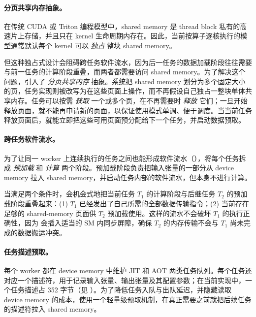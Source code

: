 \paragraph{分页共享内存抽象。}
在传统 CUDA 或 Triton 编程模型中，shared memory 是 thread block 私有的高速片上存储，并且只在 kernel 生命周期内存在。因此，当前按算子逐核执行的模型通常默认每个 kernel 可以 {\em 独占} 整块 shared memory。

但这种独占式设计会阻碍跨任务软件流水，因为后一任务的数据加载阶段往往需要与前一任务的计算阶段重叠，而两者都需要访问 shared memory。为了解决这个问题，\Sys 引入了 {\em 分页共享内存} 抽象。系统把 shared memory 划分为多个固定大小的页，任务实现则被改写为在这些页面上操作，而不再假设自己独占一整块单体共享内存。任务可以按需 {\em 获取} 一个或多个页，在不再需要时 {\em 释放} 它们；一旦开始释放页面，就不能再申请新的页面，以保证使用模式单调、便于调度。当当前任务释放页面后，\sys 就能立即把这些可用页面预分配给下一个任务，并启动数据预取。

\paragraph{跨任务软件流水。}
为了让同一 worker 上连续执行的任务之间也能形成软件流水（），\sys 将每个任务拆成 {\em 预加载} 和 {\em 计算} 两个阶段。预加载阶段负责把输入张量的一部分从 device memory 拉入 shared memory，并启动任务内部的软件流水，但本身不进行计算。

当满足两个条件时，\Sys 会机会式地把当前任务 $T_1$ 的计算阶段与后继任务 $T_2$ 的预加载阶段重叠起来：(1) $T_1$ 已经发出了自己所需的全部数据传输指令；(2) 当前存在足够的 shared-memory 页面供 $T_2$ 预加载使用。这样的流水不会破坏 $T_1$ 的执行正确性，因为 \sys 会插入适当的 SM 内同步屏障，确保 $T_2$ 的内存传输不会与 $T_1$ 尚未完成的数据搬运冲突。

\paragraph{任务描述预取。}
每个 worker 都在 device memory 中维护 JIT 和 AOT 两类任务队列。每个任务还对应一个描述符，用于记录输入张量、输出张量及其配置参数；在当前实现中，一个任务描述占 352 字节（见 ）。为了降低任务入队与出队延迟，并隐藏读取 device memory 的成本，\sys 使用一个轻量级预取机制，在真正需要之前就把后续任务的描述符拉入 shared memory。
